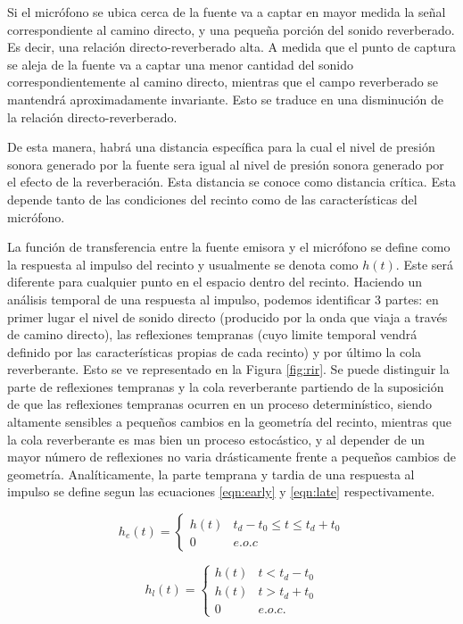 Si el micrófono se ubica cerca de la fuente va a captar en mayor medida la señal correspondiente al camino directo, y una pequeña porción del sonido reverberado. Es decir, una relación directo-reverberado alta. A medida que el punto de captura se aleja de la fuente va a captar una menor cantidad del sonido correspondientemente al camino directo, mientras que el campo reverberado se mantendrá aproximadamente invariante. Esto se traduce en una disminución de la relación directo-reverberado. 

De esta manera, habrá una distancia específica para la cual el nivel de presión sonora generado por la fuente sera igual al nivel de presión sonora generado por el efecto de la reverberación. Esta distancia se conoce como distancia crítica. Esta depende tanto de las condiciones del recinto como de las características del micrófono. 

La función de transferencia entre la fuente emisora y el micrófono se define como la respuesta al impulso del recinto y usualmente se denota como $h(t)$. Este será diferente para cualquier punto en el espacio dentro del recinto. Haciendo un análisis temporal de una respuesta al impulso, podemos identificar 3 partes: en primer lugar el nivel de sonido directo (producido por la onda que viaja a través de camino directo), las reflexiones tempranas (cuyo limite temporal vendrá definido por las características propias de cada recinto) y por último la cola reverberante. Esto se ve representado en la Figura \ref{fig:rir}. Se puede distinguir la parte de reflexiones tempranas y la cola reverberante partiendo de la suposición de que las reflexiones tempranas ocurren en un proceso determinístico, siendo altamente sensibles a pequeños cambios en la geometría del recinto, mientras que la cola reverberante es mas bien un proceso estocástico, y al depender de un mayor número de reflexiones no varia drásticamente frente a pequeños cambios de geometría. Analíticamente, la parte temprana y tardia de una respuesta al impulso se define segun las ecuaciones \ref{eqn:early} y \ref{eqn:late} respectivamente.

\begin{equation}\label{eqn:early}
h_{e}(t) = \left\{\begin{matrix}
h(t) & t_{d}-t_{0}\leq t \leq t_{d}+t_{0}\\ 
0 & e.o.c 
\end{matrix}\right.
\end{equation} 

\begin{equation}\label{eqn:late}
h_{l}(t) = \left\{\begin{matrix}
h(t) & t < t_{d} - t_{0} \\ 
h(t) & t > t_{d} + t_{0}\\ 
0 & e.o.c. 
\end{matrix}\right.
\end{equation} 

